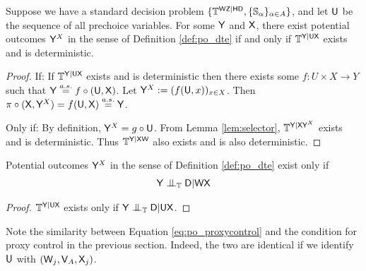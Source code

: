 \begin{theorem}
Suppose we have a standard decision problem $\{\mathbb{T}^{\mathsf{WZ}|\mathsf{HD}},\{\mathbb{S}_\alpha\}_{\alpha\in A}\}$, and let $\mathsf{U}$ be the sequence of all prechoice variables. For some $\mathsf{Y}$ and $\mathsf{X}$, there exist potential outcomes $\mathsf{Y}^X$ in the sense of Definition \ref{def:po_dte} if and only if $\mathbb{T}^{\mathsf{Y}|\mathsf{UX}}$ exists and is deterministic.
\end{theorem}

\begin{proof}
If:
If $\mathbb{T}^{\mathsf{Y}|\mathsf{UX}}$ exists and is deterministic then there exists some $f:U\times X\to Y$ such that $\mathsf{Y}\overset{a.s.}{=} f\circ(\mathsf{U},\mathsf{X})$. Let $\mathsf{Y}^X:=(f(\mathsf{U},x))_{x\in X}$. Then $\pi\circ(\mathsf{X},\mathsf{Y}^X)=f(\mathsf{U},\mathsf{X})\overset{a.s.}{=}\mathsf{Y}$.

Only if:
By definition, $\mathsf{Y}^X=g\circ \mathsf{U}$. From Lemma \ref{lem:selector}, $\mathbb{T}^{\mathsf{Y}|\mathsf{XY}^X}$ exists and is deterministic. Thus $\mathbb{T}^{\mathsf{Y}|\mathsf{XW}}$ also exists and is also deterministic.
\end{proof}

\begin{corollary}
Potential outcomes $\mathsf{Y}^X$ in the sense of Definition \ref{def:po_dte} exist only if 
\begin{align}
    \RV{Y}\CI_{\model{T}}\RV{D}|\RV{WX} \label{eq:po_proxycontrol}
\end{align}
\end{corollary}

\begin{proof}
$\mathbb{T}^{\mathsf{Y}|\mathsf{UX}}$ exists only if $\RV{Y}\CI_{\model{T}}\RV{D}|\RV{UX}$.
\end{proof}

Note the similarity between Equation \ref{eq:po_proxycontrol} and the condition for proxy control in the previous section. Indeed, the two are identical if we identify $\mathsf{U}$ with $(\mathsf{W}_j,\mathsf{V}_A,\mathsf{X}_j)$.